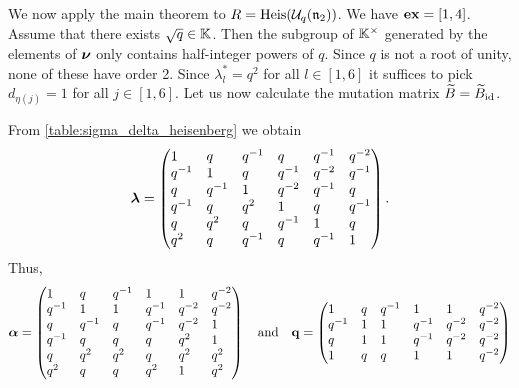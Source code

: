 \begin{example}

	We now apply the main theorem to $R = \operatorname{Heis}(\mathcal{U}_q(\mathfrak{n}_2))$. We have $\mathbf{ex} =
		[1,4]$. Assume that there exists $\sqrt{q} \in \mathbb{K}$. Then the subgroup of
	$\mathbb{K}^\times$ generated by the elements of $\boldsymbol{\nu}$ only contains half-integer powers of
	$q$. Since $q$ is not a root of unity, none of these have order 2. Since $\lambda_l^* =
		q^2$ for all $l \in [1, 6]$ it suffices to pick $d_{\eta(j)} = 1$ for all $j \in [1,
			6]$. Let us now calculate the mutation matrix $\widetilde{B} = \widetilde{B}_{\operatorname{id}}$.

	From \cref{table:sigma_delta_heisenberg} we obtain
	\begin{equation*}
		\bbl = \begin{pmatrix*}[l]
			1     & q     & q\inv & q      & q\inv  & q^{-2} \\
			q\inv & 1     & q     & q\inv  & q^{-2} & q\inv  \\
			q     & q\inv & 1     & q^{-2} & q\inv  & q      \\
			q\inv & q     & q^2   & 1      & q      & q\inv  \\
			q     & q^2   & q     & q\inv  & 1      & q      \\
			q^2   & q     & q\inv & q      & q\inv  & 1
		\end{pmatrix*}.
	\end{equation*}
	Thus,
	\begin{equation*}
		\boldsymbol{\alpha} = \begin{pmatrix*}[l]
			1     & q     & q\inv & 1      & 1      & q^{-2} \\
			q\inv & 1     & 1     & q\inv  & q^{-2} & q^{-2} \\
			q     & q\inv & q     & q^{-1} & q^{-2} & 1      \\
			q\inv & q     & q     & q      & q^2    & 1      \\
			q     & q^2   & q^2   & q      & q^2    & q^2    \\
			q^2   & q     & q     & q^2    & 1      & q^2
		\end{pmatrix*}
		\quad \text{and}\quad \bbq = \begin{pmatrix*}[l]
			1     & q   & q\inv & 1      & 1      & q^{-2} \\
			q\inv & 1   & 1     & q\inv  & q^{-2} & q^{-2} \\
			q     & 1   & 1     & q^{-1} & q^{-2} & q^{-2} \\
			1     & q   & q     & 1      & 1      & q^{-2} \\

\end{pmatrix*}
\end{equation*}
\end{example}
